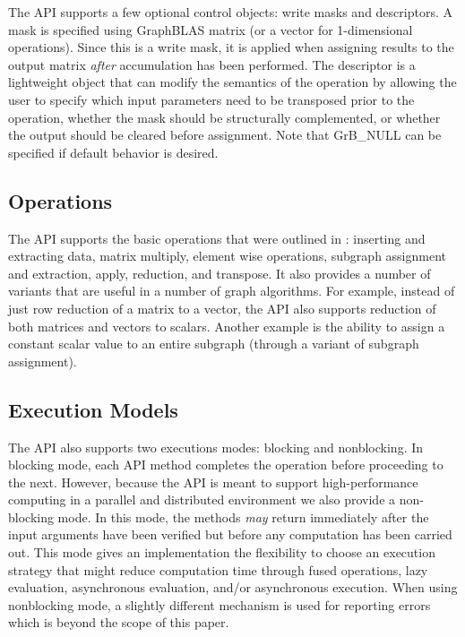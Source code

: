 The API supports a few optional control objects: write masks and descriptors.  A
mask is specified using GraphBLAS matrix (or a vector for 1-dimensional operations).
Since this is a write mask, it is applied when assigning results to the output matrix
{\em after} accumulation has been performed.
The descriptor is a lightweight object that can modify the semantics of the
operation by allowing the user to specify which input parameters need to be transposed
prior to the operation, whether the mask should be structurally complemented, or whether
the output should be cleared before assignment.
Note that {\sf GrB\_NULL} can be specified if default behavior is desired.

\subsection{Operations}

The API supports the basic operations that were outlined in \cite{mathgraphblas16}:
inserting and extracting data, matrix multiply, element wise operations, subgraph assignment
and extraction, apply, reduction, and transpose.  It also provides a number of
variants that are useful in a number of graph algorithms. For example, instead of
just row reduction of a matrix to a vector, the API also supports reduction of both
matrices and vectors to scalars.  Another example is the ability to assign a constant
scalar value to an entire subgraph (through a variant of subgraph assignment). 

\subsection{Execution Models}

The API also supports two executions modes: blocking and nonblocking. In blocking mode,
each API method completes the operation before proceeding to the next.  However, 
because the API is meant to support high-performance computing in a parallel and
distributed environment we also provide a non-blocking mode.  In this mode, the methods
{\em may} return immediately after the input arguments have been verified but before
any computation has been carried out.  This mode gives an implementation the flexibility
to choose an execution strategy that might reduce computation time through fused
operations, lazy evaluation, asynchronous evaluation, and/or asynchronous execution.  When
using nonblocking mode, a slightly different mechanism is used for reporting errors which
is beyond the scope of this paper.
